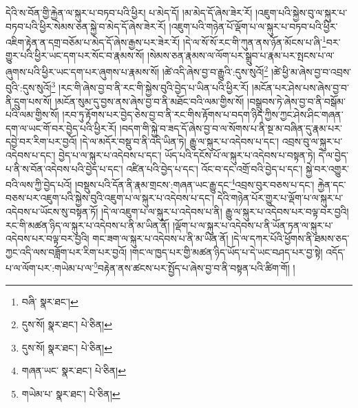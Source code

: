 དེའི་ས་བོན་གྱི་རྐྱེན་ལ་སྐུར་པ་བཏབ་པའི་ཕྱིར། པ་མེད་དོ། །མ་མེད་དོ་ཞེས་ཟེར་རོ། །འཇུག་པའི་སྐྱེས་བུ་ལ་སྐུར་པ་བཏབ་པའི་ཕྱིར་སེམས་ཅན་སྐྱེ་བ་མེད་དོ་ཞེས་ཟེར་རོ། །འཇུག་པའི་གཉེན་པོ་ལྡོག་པ་ལ་སྐུར་པ་བཏབ་པའི་ཕྱིར་འཇིག་རྟེན་ན་དགྲ་བཅོམ་པ་མེད་དོ་ཞེས་རྒྱས་པར་ཟེར་རོ། །དེ་ལ་སོ་སོ་རང་གི་ཀུན་ནས་ཉོན་མོངས་པ་ཞི་\footnote{བཞི་  སྣར་ཐང་། }བར་གྱུར་པའི་ཕྱིར་ཡང་དག་པར་སོང་བ་རྣམས་སོ། །སེམས་ཅན་རྣམས་ལ་ལོག་པར་སྒྲུབ་པ་རྣམ་པར་སྤངས་པ་ལ་ཞུགས་པའི་ཕྱིར་ཡང་དག་པར་ཞུགས་པ་རྣམས་སོ། །ཚེ་འདི་ཞེས་བྱ་བ་རྒྱུའི་:དུས་སུའོ།\footnote{དུས་སོ།  སྣར་ཐང་།  པེ་ཅིན། } །ཚེ་ཕྱི་མ་ཞེས་བྱ་བ་འབྲས་བུའི་:དུས་སུའོ།\footnote{དུས་སོ།  སྣར་ཐང་།  པེ་ཅིན། } །རང་གི་ཞེས་བྱ་བ་ནི་རང་གི་སྐྱེས་བུའི་བྱེད་པ་ཡིན་པའི་ཕྱིར་རོ། །མངོན་པར་ཤེས་པས་ཞེས་བྱ་བ་ནི་དྲུག་པས་སོ། །མངོན་སུམ་དུ་བྱས་ནས་ཞེས་བྱ་བ་ནི་མཐོང་བའི་ལམ་གྱིས་སོ། །བསྒྲུབས་ཏེ་ཞེས་བྱ་བ་ནི་བསྒོམ་པའི་ལམ་གྱིས་སོ། །རབ་ཏུ་རྟོགས་པར་བྱེད་ཅེས་བྱ་བ་ནི་རང་གིས་རྟོགས་པ་བདག་ཉིད་ཀྱིས་ཀྱང་ཤེས་ཤིང་གཞན་དག་ལ་ཡང་གོ་བར་བྱེད་པའི་ཕྱིར་རོ། །བདག་གི་སྐྱེ་བ་ཟད་དོ་ཞེས་བྱ་བ་ལ་སོགས་པ་ནི་སྔ་མ་བཞིན་དུ་རྣམ་པར་དབྱེ་བར་རིག་པར་བྱའོ། །དེ་ལ་མདོར་བསྡུ་བ་ནི་འདི་ཡིན་ཏེ། རྒྱུ་ལ་སྐུར་པ་འདེབས་པ་དང་། འབྲས་བུ་ལ་སྐུར་པ་འདེབས་པ་དང་། བྱེད་པ་ལ་སྐུར་པ་འདེབས་པ་དང་། ཡོད་པའི་དངོས་པོ་ལ་སྐུར་པ་འདེབས་པ་བསྟན་ཏེ། དེ་ལ་བྱེད་པ་ནི་ས་བོན་འདེབས་པའི་བྱེད་པ་དང་། འཛིན་པའི་བྱེད་པ་དང་། འོང་བ་དང་འགྲོ་བའི་བྱེད་པ་དང་། སྐྱེ་བར་འགྱུར་བའི་ལས་ཀྱི་བྱེད་པའོ། །བསྡུས་པའི་དོན་ནི་རྣམ་གྲངས་:གཞན་ཡང་རྒྱུ་དང་\footnote{གཞན་ཡང་  སྣར་ཐང་།  པེ་ཅིན། }འབྲས་བུར་བཅས་པ་དང་། རྐྱེན་དང་བཅས་པར་འཇུག་པའི་སྐྱེས་བུའི་འཇུག་པ་ལ་སྐུར་པ་འདེབས་པ་དང་། དེའི་གཉེན་པོར་གྱུར་པ་ལྡོག་པ་ལ་སྐུར་པ་འདེབས་པ་ཡོངས་སུ་བསྟན་ཏོ། །དེ་ལ་འཇུག་པ་ལ་སྐུར་པ་འདེབས་པ་ནི། རྒྱུ་ལ་སྐུར་པ་འདེབས་པར་བལྟ་བར་བྱའི། རང་གི་མཚན་ཉིད་ལ་སྐུར་པ་འདེབས་པ་ནི་མ་ཡིན་ནོ། །ལྡོག་པ་ལ་སྐུར་པ་འདེབས་པ་ནི་ཡོན་ཏན་ལ་སྐུར་པ་འདེབས་པར་བལྟ་བར་བྱའི། གང་ཟག་ལ་སྐུར་པ་འདེབས་པ་ནི་མ་ཡིན་ནོ། །དེ་ལ་དཀར་པོའི་ཕྱོགས་ནི་ཐམས་ཅད་ཀྱང་འདི་ལས་བཟློག་པར་རིག་པར་བྱའོ། །གང་ལ་ཁྱད་པར་གྱི་མཚན་ཉིད་ཡོད་པ་དེ་ཡང་བཤད་པར་བྱ་སྟེ། འདོད་པ་ལ་ལོག་པར་:གཡེམ་པ་ལ་\footnote{གཡེམ་པ་  སྣར་ཐང་།  པེ་ཅིན། }བརྟེན་ནས་ཚངས་པར་སྤྱོད་པ་ཞེས་བྱ་བ་ནི་བསྟན་པའི་ཚིག་གོ། །
